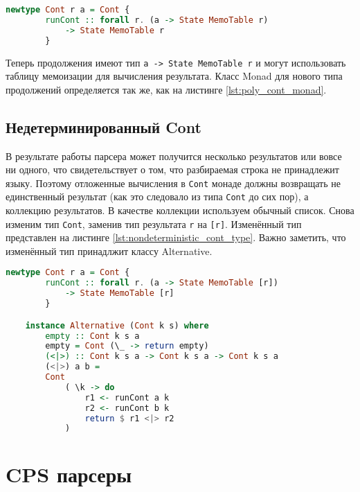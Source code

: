 \documentclass[times]{itmo-student-thesis}
\begin{document}
\begin{lstlisting}[language=Haskell,float=!h,caption={Тип Cont с состоянием},label={lst:stateful_cont_type}]
    newtype Cont r a = Cont { 
        runCont :: forall r. (a -> State MemoTable r) 
            -> State MemoTable r 
        }
\end{lstlisting}

Теперь продолжения имеют тип \lstinline{a -> State MemoTable r} и могут использовать таблицу мемоизации для вычисления результата.
Класс Monad для нового типа продолжений определяется так же, как на листинге \ref{lst:poly_cont_monad}.

\subsection{Недетерминированный Cont}\label{sec:contt_transformer}

В результате работы парсера может получится несколько результатов или вовсе ни одного, что свидетельствует о том, что 
разбираемая строка не принадлежит языку. Поэтому отложенные вычисления в \lstinline{Cont} монаде должны возвращать не 
единственный результат (как это следовало из типа \lstinline{Cont} до сих пор), а коллекцию результатов. В качестве коллекции используем обычный список.
Снова изменим тип \lstinline{Cont}, заменив тип результата \lstinline{r} на \lstinline{[r]}. Изменённый тип представлен на листинге \ref{lst:nondeterministic_cont_type}.
Важно заметить, что изменённый тип принадлжит классу Alternative.

\begin{lstlisting}[language=Haskell,float=!h,caption={Недетерминированный Cont с состоянием},label={lst:nondeterministic_cont_type}]
    newtype Cont r a = Cont { 
        runCont :: forall r. (a -> State MemoTable [r]) 
            -> State MemoTable [r] 
        }

    instance Alternative (Cont k s) where
        empty :: Cont k s a
        empty = Cont (\_ -> return empty)
        (<|>) :: Cont k s a -> Cont k s a -> Cont k s a
        (<|>) a b =
        Cont
            ( \k -> do
                r1 <- runCont a k
                r2 <- runCont b k
                return $ r1 <|> r2
            )
\end{lstlisting}

\section{CPS парсеры}\label{sec:cps_parser}
\end{document}
